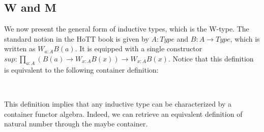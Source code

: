 \subsection{W and M}

We now present the general form of inductive types, which is the W-type. The standard notion in the HoTT book is given by $A : Type$ and $B : A \to Type$, which is written as $W_{a : A} B (a)$. It is equipped with a single constructor $sup : \prod_{a : A} (B (a) \to W_{x : A} B (x)) \to W_{x : A} B (x)$. Notice that this definition is equivalent to the following container definition:

\begin{code}%
\>[0]\AgdaSpace{}%
\AgdaSpace{}%
\AgdaSymbol{(}\AgdaSpace{}%
\AgdaSymbol{:}\AgdaSpace{}%
\AgdaSymbol{)}\AgdaSpace{}%
\AgdaSymbol{:}\AgdaSpace{}%
\AgdaSpace{}%
\<%
\\
\>[0][@{}l@{\AgdaIndent{0}}]%
\>[2]\AgdaSpace{}%
\AgdaSymbol{:}\AgdaSpace{}%
\AgdaSpace{}%
\AgdaSpace{}%
\AgdaSpace{}%
\AgdaSymbol{(}\AgdaSpace{}%
\AgdaSymbol{)}\AgdaSpace{}%
\AgdaSpace{}%
\AgdaSpace{}%
\<%
\end{code}

This definition implies that any inductive type can be characterized by a container functor algebra. Indeed, we can retrieve an equivalent definition of natural number through the maybe container.

\begin{code}%
\>[0]\AgdaSpace{}%
\AgdaSymbol{:}\AgdaSpace{}%
\<%
\\
\>[0]\AgdaSpace{}%
\AgdaSymbol{=}\AgdaSpace{}%
\AgdaSymbol{(}\AgdaSpace{}%
\AgdaSpace{}%
\AgdaSymbol{)}\AgdaSpace{}%
\AgdaSpace{}%
\AgdaSpace{}%
\AgdaSymbol{(}\AgdaSpace{}%
\AgdaSymbol{)}\AgdaSpace{}%
\AgdaSpace{}%
\AgdaSpace{}%
\AgdaSymbol{;}\AgdaSpace{}%
\AgdaSymbol{(}\AgdaSpace{}%
\AgdaSymbol{)}\AgdaSpace{}%
\AgdaSpace{}%
\AgdaSpace{}%
\AgdaSymbol{\}}\<%
\\
%
\\[\AgdaEmptyExtraSkip]%
\>[0]\AgdaSpace{}%
\AgdaSymbol{:}\AgdaSpace{}%
\<%
\\
\>[0]\AgdaSpace{}%
\AgdaSymbol{=}\AgdaSpace{}%
\AgdaSpace{}%
\<%
\end{code}

